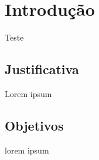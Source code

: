 
\chapter{Introdução}
\label{introducao}

Teste

\section{Justificativa}
\label{justificativa}

Lorem ipsum

\section{Objetivos}
\label{objetivos}

lorem ipsum
